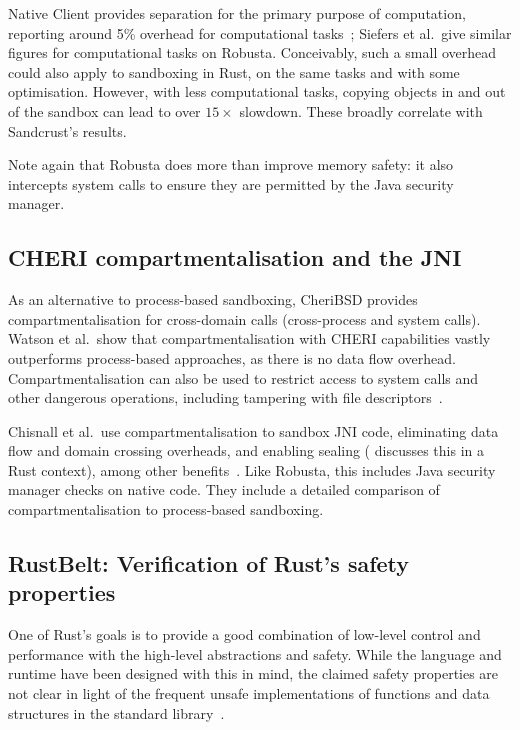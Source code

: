 \documentclass[dissertation.tex]{subfiles}
\begin{document}
Native Client provides separation for the primary purpose of
computation, reporting around 5\% overhead for computational
tasks~\cite{yee-nacl}; Siefers et al.\ give similar figures for
computational tasks on Robusta.
Conceivably, such a small overhead could also apply to sandboxing in
Rust, on the same tasks and with some optimisation.
However, with less computational tasks, copying objects in and out of
the sandbox can lead to over \(15\times\) slowdown.
These broadly correlate with Sandcrust's results.

Note again that Robusta does more than improve memory safety: it also
intercepts system calls to ensure they are permitted by the Java
security manager.


\subsection{CHERI compartmentalisation and the JNI}
\label{sec:rel-cheri-jni}

As an alternative to process-based sandboxing, CheriBSD provides
compartmentalisation for cross-domain calls (cross-process and system
calls).
Watson et al.\ show that compartmentalisation with CHERI capabilities
vastly outperforms process-based approaches, as there is no data flow
overhead.
Compartmentalisation can also be used to restrict access to system
calls and other dangerous operations, including tampering with file
descriptors~\cite{cheri2015}.

Chisnall et al.\ use compartmentalisation to sandbox JNI code, eliminating
data flow and domain crossing overheads, and enabling sealing
( discusses this in a Rust context), among
other benefits~\cite{cheri-jni}.
Like Robusta, this includes Java security manager checks on native code.
They include a detailed comparison of compartmentalisation to
process-based sandboxing.


\subsection{RustBelt: Verification of Rust's safety properties}

One of Rust's goals is to provide a good combination of low-level
control and performance with the high-level abstractions and safety.
While the language and runtime have been designed with this in mind,
the claimed safety properties are not clear in light of the frequent
unsafe implementations of functions and data structures in the standard
library~\cite{rustbelt-web}.
\end{document}
